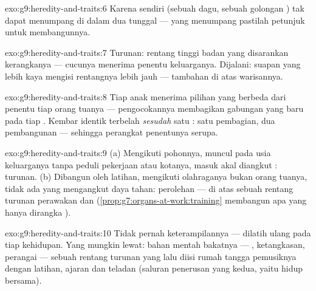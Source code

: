 \begin{solution}{exo:g9:heredity-and-traits:6}
Karena  sendiri (sebuah dagu, sebuah golongan )
tak dapat menumpang di dalam dua  tunggal --- yang
menumpang pastilah petunjuk untuk membangunnya.
\end{solution}

\begin{solution}{exo:g9:heredity-and-traits:7}
Turunan: rentang tinggi badan yang disarankan kerangkanya
--- cucunya menerima penentu keluarganya. Dijalani: suapan
yang lebih kaya mengisi rentangnya lebih jauh --- tambahan
 di atas warisannya.
\end{solution}

\begin{solution}{exo:g9:heredity-and-traits:8}
Tiap anak menerima pilihan yang berbeda dari penentu tiap
orang tuanya --- pengocokannya membagikan gabungan yang
baru pada tiap . Kembar identik terbelah
\emph{sesudah} satu : satu pembagian, dua
pembangunan --- sehingga perangkat penentunya serupa.
\end{solution}

\begin{solution}{exo:g9:heredity-and-traits:9}
(a) Mengikuti pohonnya, muncul pada usia keluarganya tanpa
peduli pekerjaan atau kotanya, masuk akal diangkut :
turunan. (b) Dibangun oleh latihan, mengikuti olahraganya
bukan orang tuanya, tidak ada  yang mengangkut daya
tahan: perolehan --- di atas sebuah rentang turunan
perawakan dan 
(\cref{prop:g7:organs-at-work:training} membangun apa yang
hanya dirangka ).
\end{solution}

\begin{solution}{exo:g9:heredity-and-traits:10}
Tidak pernah keterampilannya ---  dilatih ulang
pada tiap kehidupan. Yang mungkin lewat: bahan mentah
bakatnya --- , ketangkasan, perangai --- sebuah
rentang turunan yang lalu diisi rumah tangga pemusiknya
dengan latihan, ajaran dan teladan (saluran penerusan yang
kedua, yaitu hidup bersama).
\end{solution}

